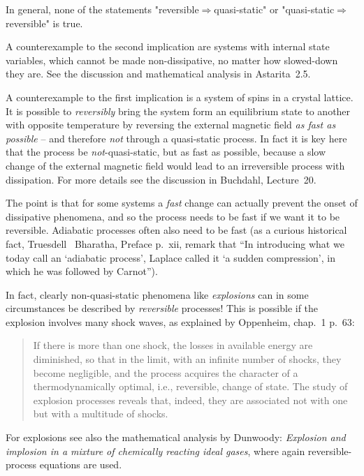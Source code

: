 \printpagenotes*
\clearpage

\label{ncha:thermodynamics}

\label{nsec:quasistatic}

In general, none of the statements "reversible${}\Rightarrow{}$quasi-static" or "quasi-static${}\Rightarrow{}$reversible"
is true.

A counterexample to the second implication are systems with internal state variables, which cannot be made non-dissipative, no matter how slowed-down they are. See the discussion and mathematical analysis in Astarita \sect\,2.5.


A counterexample to the first implication is a system of spins in a crystal lattice. It is possible to \emph{reversibly} bring the system form an equilibrium state to another with opposite temperature by reversing the external magnetic field \emph{as fast as possible} -- and therefore \emph{not} through a quasi-static process. In fact it is key here that the process be \emph{not}-quasi-static, but as fast as possible, because a slow change of the external magnetic field would lead to an irreversible process with dissipation. For more details see the discussion in Buchdahl, Lecture~20.

The point is that for some systems a \emph{fast} change can actually prevent the onset of dissipative phenomena, and so the process needs to be fast if we want it to be reversible. Adiabatic processes often also need to be fast (as a curious historical fact, Truesdell \amp\ Bharatha, Preface p.~xii, remark that \enquote{In introducing what we today call an `adiabatic process', Laplace called it `a sudden compression', in which he was followed by Carnot}).

In fact, clearly non-quasi-static phenomena like \emph{explosions} can in some circumstances be described by \emph{reversible} processes! This is possible if the explosion involves many shock waves, as explained by Oppenheim, chap.~1 p.~63:
\begin{quote}
  If there is more than one shock, the losses in available energy are diminished, so that in the limit, with an infinite number of shocks, they become negligible, and the process acquires the character of a thermodynamically optimal, i.e., reversible, change of state. The study of explosion processes reveals that, indeed, they are associated not with one but with a multitude of shocks.
\end{quote}
For explosions see also the mathematical analysis by Dunwoody: \emph{Explosion and implosion in a mixture of chemically reacting ideal gases}, where again reversible-process equations are used.

